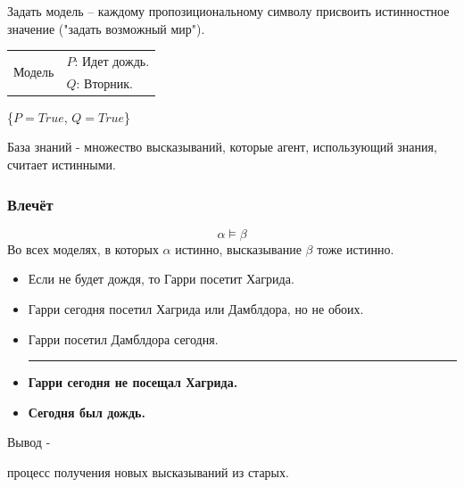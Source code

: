 \begin{frame}
	\Large
	Задать {\Huge модель} -- каждому пропозициональному символу 
	присвоить истинностное значение ("задать возможный мир").
\end{frame}

\begin{frame}
	\Huge
	\begin{center}
	\begin{tabular}{c l }
		\multirow{2}{*}{Модель} 
			& $P$: Идет дождь. \\
			& $Q$: Вторник.\\
	\end{tabular}

		\{$P=True$, $Q=True$\}
	\end{center}
\end{frame}

\begin{frame}
		\Huge База знаний \Large- множество высказываний,
	которые агент, использующий знания, считает истинными.
\end{frame}

\begin{frame}
	\Large
	\begin{center}
	\frametitle{Влечёт}
	$$\alpha \models \beta$$
	Во всех моделях, в которых $\alpha$ истинно, 
	высказывание $\beta$ тоже истинно.
	\end{center}
\end{frame}
\begin{frame}
	\begin{itemize}[label={}]
		\item Если не будет дождя, то Гарри посетит Хагрида.
		\item Гарри сегодня посетил Хагрида или Дамблдора, но не обоих.
		\item Гарри посетил Дамблдора сегодня.

\;
			\hrule
			\;

		\item \textbf{Гарри сегодня не посещал Хагрида.}
		\item \textbf{Сегодня был дождь.}
	\end{itemize}
\end{frame}

\begin{frame}
	\Huge Вывод -  

\Large	процесс получения новых высказываний из старых.
\end{frame}

